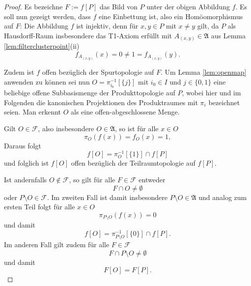 \begin{proof}
  Es bezeichne $F := f[P]$ das Bild von $P$ unter der obigen Abbildung $f$.
  Es soll nun gezeigt werden, dass $f$ eine Einbettung ist, also ein Homöomorphismus auf $F$:
  Die Abbildung $f$ ist injektiv, denn für $x,y \in P$ mit $x \neq y$ gilt, da $P$ als Hausdorff-Raum insbesondere das T1-Axiom erfüllt mit $A_{(x,y)} \in \mathfrak{A}$ aus Lemma \ref{lem:filterclusterpoint}(ii) 
  \begin{displaymath}
    f_{A_{(x,y)}}(x) = 0 \neq 1 = f_{A_{(x,y)}}(y).
  \end{displaymath}

  Zudem ist $f$ offen bezüglich der Spurtopologie auf $F$.
  Um Lemma \ref{lem:openmap} anwenden zu können sei nun $O = \pi_{i_0}^{-1}[\{j\}]$ mit $i_0 \in I$ und $j \in \{0,1\}$ eine beliebige offene Subbasismenge der Produkttopologie auf $P$,  wobei hier und im Folgenden die kanonischen Projektionen des Produktraumes mit $\pi_i$ bezeichnet seien.
  Man erkennt $O$ als eine offen-abgeschlossene Menge. 

  Gilt $O \in \mathcal{F}$, also insbesondere $O \in \mathfrak{A}$, so ist für alle $x \in O$
  \begin{displaymath}
    \pi_O(f(x)) = f_O(x) = 1,
  \end{displaymath}
  Daraus folgt 
  \begin{displaymath}
    f[O] = \pi_O^{-1}[\{1\}] \cap f[P]
  \end{displaymath}
  und folglich ist $f[O]$ offen bezüglich der Teilraumtopologie auf $f[P]$.

  Ist andernfalls $O \not\in \mathcal{F}$, so gilt für alle $F \in \mathcal{F}$ entweder
  \begin{displaymath}
    F \cap O \neq \emptyset
  \end{displaymath}
  oder $P \setminus O \in \mathcal{F}$.
  Im zweiten Fall ist damit insbesondere $P \setminus O \in \mathfrak{A}$ und analog zum ersten Teil folgt für alle $x \in O$
  \begin{displaymath}
    \pi_{P \setminus O}(f(x)) = 0
  \end{displaymath}
  und damit 
  \begin{displaymath}
    f[O] = \pi_{P \setminus O}^{-1}[\{0\}] \cap f[P].
  \end{displaymath}
  Im anderen Fall gilt zudem für alle $F \in \mathcal{F}$
  \begin{displaymath}
    F \cap P \setminus O \neq \emptyset
  \end{displaymath}
  und damit 
  \begin{displaymath}
    F[O] = F[P].
  \end{displaymath}


\end{proof}
